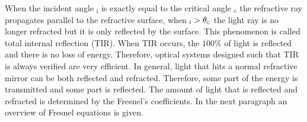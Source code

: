 When the incident angle \myangle$_{\textrm{i}}$ is exactly equal to the critical angle \myangle$_{\textrm{c}}$ the refractive ray propagates parallel to the refractive surface, 
when \myangle$_{\textrm{i}}>\mbox{$\theta$}_{\textrm{c}}$ the light ray is no longer refracted but it is only reflected by the surface. This phenomenon is called total internal reflection (TIR). When TIR occurs, the $100\%$ of light is reflected and there is no loss of energy. Therefore, optical systems designed such that TIR is always verified are very efficient. In general, light that hits a normal refractive mirror can be both reflected and refracted. Therefore, some part of the energy is transmitted and some part is reflected. The amount of light that is reflected and refracted is determined by the Fresnel's coefficients.
In the next paragraph an overview of  Fresnel equations is given.

